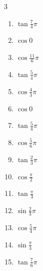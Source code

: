 \begin{multicols}{3}
\begin{enumerate}
  \item $\displaystyle \tan{\frac{7}{4}\pi}$
        \phantom{$\displaystyle =-1$}

  \item $\displaystyle \cos{0}$
        \phantom{$\displaystyle =1$}

  \item $\displaystyle \cos{\frac{11}{6}\pi}$

  \item $\displaystyle \tan{\frac{5}{4}\pi}$
        \phantom{$\displaystyle =1$}

  \item $\displaystyle \cos{\frac{4}{3}\pi}$

  \item $\displaystyle \cos{0}$
        \phantom{$\displaystyle =1$}

  \item $\displaystyle \tan{\frac{5}{4}\pi}$
        \phantom{$\displaystyle =1$}

  \item $\displaystyle \cos{\frac{5}{6}\pi}$

\columnbreak %

  \item $\displaystyle \tan{\frac{2}{3}\pi}$

  \item $\displaystyle \cos{\frac{\pi}{2}}$
        \phantom{$\displaystyle =0$}

  \item $\displaystyle \tan{\frac{\pi}{3}}$

  \item $\displaystyle \sin{\frac{2}{3}\pi}$

  \item $\displaystyle \cos{\frac{5}{4}\pi}$

  \item $\displaystyle \sin{\frac{\pi}{3}}$

  \item $\displaystyle \tan{\frac{7}{6}\pi}$


\end{enumerate}
\end{multicols}
